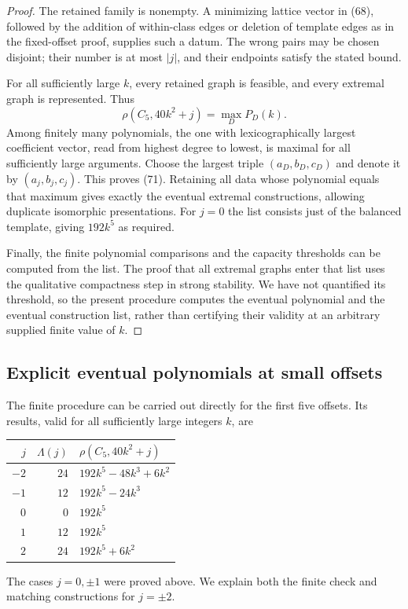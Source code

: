 \begin{proof}
The retained family is nonempty. A minimizing lattice vector in (68),
followed by the addition of within-class edges or deletion of template
edges as in the fixed-offset proof, supplies such a datum. The wrong
pairs may be chosen disjoint; their number is at most $|j|$, and their
endpoints satisfy the stated bound.

For all sufficiently large $k$, every retained graph is feasible, and
every extremal graph is represented. Thus
\[
 \rho(C_5,40k^2+j)=\max_D P_D(k).
\]
Among finitely many polynomials, the one with lexicographically largest
coefficient vector, read from highest degree to lowest, is maximal for
all sufficiently large arguments. Choose the largest triple
$(a_D,b_D,c_D)$ and denote it by $(a_j,b_j,c_j)$. This proves (71).
Retaining all data whose polynomial equals that maximum gives exactly
the eventual extremal constructions, allowing duplicate isomorphic
presentations. For $j=0$ the list consists just of the balanced
template, giving $192k^5$ as required.

Finally, the finite polynomial comparisons and the capacity thresholds
can be computed from the list. The proof that all extremal graphs
enter that list uses the qualitative compactness step in strong
stability. We have not quantified its threshold, so the present
procedure computes the eventual polynomial and the eventual
construction list, rather than certifying their validity at an
arbitrary supplied finite value of $k$.
\end{proof}

\subsection{Explicit eventual polynomials at small offsets}

The finite procedure can be carried out directly for the first five
offsets. Its results, valid for all sufficiently large integers $k$, are
\begin{center}
\begin{tabular}{rrl}
\toprule
$j$&$\Lambda(j)$&$\rho(C_5,40k^2+j)$\\
\midrule
$-2$&$24$&$192k^5-48k^3+6k^2$\\
$-1$&$12$&$192k^5-24k^3$\\
$0$&$0$&$192k^5$\\
$1$&$12$&$192k^5$\\
$2$&$24$&$192k^5+6k^2$\\
\bottomrule
\end{tabular}
\end{center}
The cases $j=0,\pm1$ were proved above. We explain both the finite
check and matching constructions for $j=\pm2$.

